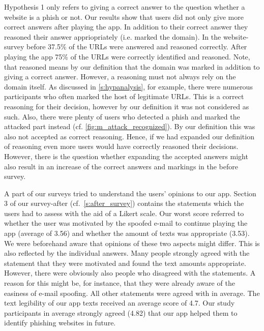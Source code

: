 \begin{description}[leftmargin=0cm]
	\item[Correct and Reasoned Answers] Hypothesis 1 only refers to giving a correct answer to the question whether a website is a phish or not.
	Our results show that users did not only give more correct answers after playing the app.
	In addition to their correct answer they reasoned their answer appriopriately (i.e. marked the domain).
	In the website-survey before 37.5\% of the URLs were answered and reasoned correctly.
	After playing the app 75\% of the URLs were correctly identified and reasoned. 
	Note, that reasoned means by our definition that the domain was marked in addition to giving a correct answer.
	However, a reasoning must not always rely on the domain itself. 
	As discussed in \autoref{s:hypanalysis}, for example, there were numerous participants who often marked the host of legitimate URLs.
	This is a correct reasoning for their decision, however by our definition it was not considered as such.
	Also, there were plenty of users who detected a phish and marked the attacked part instead (cf. \autoref{fig:m_attack_recognized}).
	By our definition this was also not accepted as correct reasoning.
	Hence, if we had expanded our definition of reasoning even more users would have correctly reasoned their decisions.
	However, there is the question whether expanding the accepted answers might also result in an increase of the correct answers and markings in the before survey.
	\item[User Opinions to App] A part of our surveys tried to understand the users' opinions to our app.
	Section 3 of our survey-after (cf.~\autoref{s:after_survey}) contains the statements which the users had to assess with the aid of a Likert scale.
	Our worst score referred to whether the user was motivated by the spoofed e-mail to continue playing the app (average of 3.56) and whether the amount of texts was appropriate (3.53).
	We were beforehand aware that opinions of these two aspects might differ.
	This is also reflected by the individual answers.
	Many people strongly agreed with the statement that they were motivated and found the text amounts appropriate.
	However, there were obviously also people who disagreed with the statements.
	A reason for this might be, for instance, that they were already aware of the easiness of e-mail spoofing.
	All other statements were agreed with in average.
	The text legibility of our app texts received an average score of 4.7.
	Our study participants in average strongly agreed (4.82) that our app helped them to identify phishing websites in future.

\end{description}
